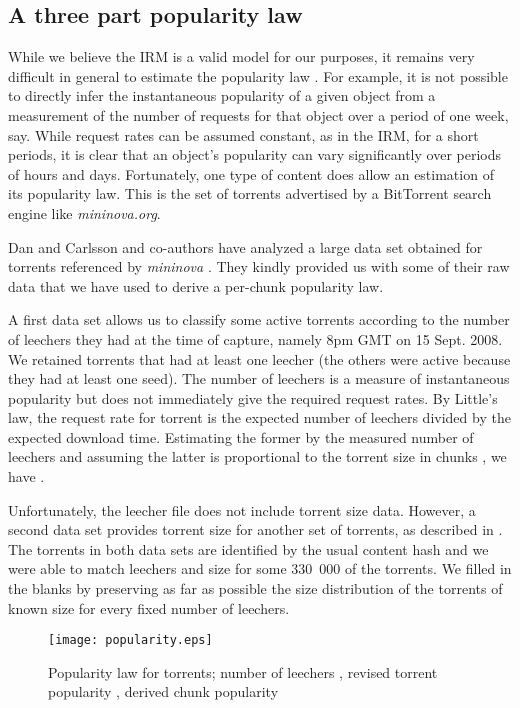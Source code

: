 \documentclass [11pt]{article}
\begin{document}
\subsection{A three part popularity law}
While we believe the IRM is a valid model for our purposes, it remains very difficult in general to estimate the popularity law . For example, it is not possible to directly infer the instantaneous popularity of a given object from a measurement of the number of requests for that object over a period of one week, say. While request rates can be assumed constant, as in the IRM, for a short periods, it is clear that an object's popularity can vary significantly over periods of hours and days.  Fortunately, one type of content does allow an estimation of its popularity law. This is the set of torrents advertised by a BitTorrent search engine like \emph{mininova.org}. 

Dan and Carlsson and co-authors have analyzed a large data set obtained for torrents referenced by \emph{mininova} \cite{DC10,CDMA12}. They kindly provided us with some of their raw data that we have used to derive a per-chunk popularity law.

A first data set allows us to classify some  active torrents according to the number of leechers they had at the time of capture, namely 8pm GMT on 15 Sept. 2008. We retained  torrents that had at least one leecher (the others were active because they had at least one seed). The number of leechers is a measure of instantaneous popularity but does not immediately give the required request rates. By Little's law, the request rate  for torrent  is the expected number of leechers divided by the expected download time. Estimating the former by the measured number of leechers  and assuming the latter is proportional to the torrent size in chunks , we have . 


Unfortunately, the leecher file does not include torrent size data. However, a second data set provides torrent size for another set of torrents, as described in \cite{CDMA12}. The torrents in both data sets are identified by the usual content hash and we were able to match leechers and size for some 330~000 of the  torrents. We filled in the blanks by preserving as far as possible the size distribution of the torrents of known size for every fixed number of leechers.

\begin{figure}[tp]
 \centering
 \texttt{[image: popularity.eps]}
 \caption{Popularity law for torrents; number of leechers , revised torrent popularity , derived chunk popularity}
 \label{fig:popularity}
\end{figure}
\end{document}
